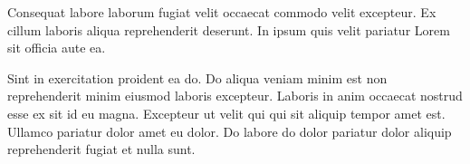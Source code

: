\documentclass{scrreprt}
\begin{document}
Consequat labore laborum fugiat velit occaecat commodo velit excepteur. Ex cillum laboris aliqua reprehenderit deserunt. In ipsum quis velit pariatur Lorem sit officia aute ea.

Sint in exercitation proident ea do. Do aliqua veniam minim est non reprehenderit minim eiusmod laboris excepteur. Laboris in anim occaecat nostrud esse ex sit id eu magna. Excepteur ut velit qui qui sit aliquip tempor amet est. Ullamco pariatur dolor amet eu dolor. Do labore do dolor pariatur dolor aliquip reprehenderit fugiat et nulla sunt.
\begin{minipage}{\linewidth}
	
\end{minipage}

\printbibliography
\listoffigures

\end{document}
